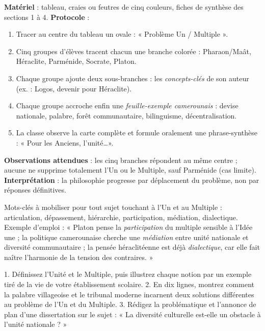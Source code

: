 \documentclass[11pt]{article}
\newcommand{\cle}[1]{{\popxbold\color{popdark}#1}}
\begin{document}
\begin{experience}
\textbf{Matériel} : tableau, craies ou feutres de cinq couleurs, fiches de synthèse des sections 1 à 4.
\textbf{Protocole} :
\begin{enumerate}
\item Tracer au centre du tableau un ovale : « Problème Un / Multiple ».
\item Cinq groupes d'élèves tracent chacun une branche colorée : Pharaon/Maât, Héraclite, Parménide, Socrate, Platon.
\item Chaque groupe ajoute deux sous-branches : les \emph{concepts-clés} de son auteur (ex. : Logos, devenir pour Héraclite).
\item Chaque groupe accroche enfin une \emph{feuille-exemple camerounais} : devise nationale, palabre, forêt communautaire, bilinguisme, décentralisation.
\item La classe observe la carte complète et formule oralement une phrase-synthèse : « Pour les Anciens, l'unité\ldots ».
\end{enumerate}
\textbf{Observations attendues} : les cinq branches répondent au même centre ; aucune ne supprime totalement l'Un ou le Multiple, sauf Parménide (cas limite). \textbf{Interprétation} : la philosophie progresse par déplacement du problème, non par réponses définitives.
\end{experience}

\begin{aretenir}
Mots-clés à mobiliser pour tout sujet touchant à l'Un et au Multiple : \cle{articulation}, \cle{dépassement}, \cle{hiérarchie}, \cle{participation}, \cle{médiation}, \cle{dialectique}. Exemple d'emploi : « Platon pense la \emph{participation} du multiple sensible à l'Idée une ; la politique camerounaise cherche une \emph{médiation} entre unité nationale et diversité communautaire ; la pensée héraclitéenne est déjà \emph{dialectique}, car elle fait naître l'harmonie de la tension des contraires. »
\end{aretenir}

\begin{exercice}
1. Définissez l'Unité et le Multiple, puis illustrez chaque notion par un exemple tiré de la vie de votre établissement scolaire.
2. En dix lignes, montrez comment la palabre villageoise et le tribunal moderne incarnent deux solutions différentes au problème de l'Un et du Multiple.
3. Rédigez la problématique et l'annonce de plan d'une dissertation sur le sujet : « La diversité culturelle est-elle un obstacle à l'unité nationale ? »
\end{exercice}
\end{document}

